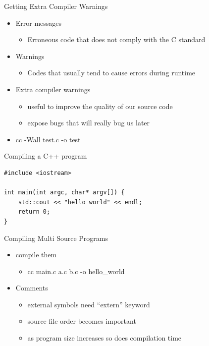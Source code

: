 \documentclass{beamer}
\begin{document}
\begin{frame}{Getting Extra Compiler Warnings}
\begin{itemize}
\item Error messages
\begin{itemize}
\item Erroneous code that does not comply with the C standard 
\end{itemize}
\item Warnings 
\begin{itemize}
\item Codes that usually tend to cause errors during runtime 
\end{itemize}
\item Extra compiler warnings 
\begin{itemize}
\item useful to improve the quality of our source code
\item expose bugs that will really bug us later  
\end{itemize}
\item cc -Wall test.c -o test
\end{itemize}
\end{frame}

\begin{frame}[fragile]{Compiling a C++ program}
\begin{lstlisting}
#include <iostream> 

int main(int argc, char* argv[]) {
    std::cout << "hello world" << endl; 
    return 0; 
}
\end{lstlisting}
\end{frame}

\begin{frame}{Compiling Multi Source Programs}
\begin{itemize}
\item compile them
\begin{itemize}
\item cc main.c a.c b.c -o hello\_world
\end{itemize}
\item Comments
\begin{itemize}
\item external symbols need ``extern'' keyword
\item source file order becomes important
\item as program size increases so does compilation time
\end{itemize}
\end{itemize}
\end{frame}
\end{document}
